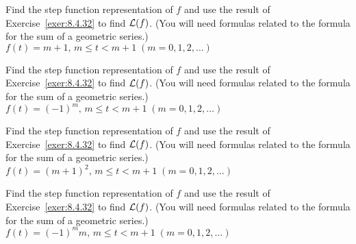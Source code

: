 \documentclass{ximera}
\begin{document}
\begin{problem}\label{exer:8.4.33}
 Find the step
function representation of $f$ and use the result of
Exercise~\ref{exer:8.4.32} to find ${\cal L}(f)$. (You will need
formulas related to the formula for the sum of a geometric series.)
$f(t)=m+1,\,m\le t<m+1\; (m=0,1,2,\dots)$
\end{problem}

\begin{problem}\label{exer:8.4.34}
 Find the step
function representation of $f$ and use the result of
Exercise~\ref{exer:8.4.32} to find ${\cal L}(f)$. (You will need
formulas related to the formula for the sum of a geometric series.)
$f(t)=(-1)^m,\,m\le t<m+1\; (m=0,1,2,\dots)$
\end{problem}

\begin{problem}\label{exer:8.4.35}
Find the step function representation of $f$ and use the result of Exercise~\ref{exer:8.4.32} to find ${\cal L}(f)$. (You will need
formulas related to the formula for the sum of a geometric series.)
$f(t)=(m+1)^2,\,m\le t<m+1\; (m=0,1,2,\dots)$
\end{problem}

\begin{problem}\label{exer:8.4.36}
 Find the step
function representation of $f$ and use the result of
Exercise~\ref{exer:8.4.32} to find ${\cal L}(f)$. (You will need
formulas related to the formula for the sum of a geometric series.)
$f(t)=(-1)^mm,\,m\le t<m+1\; (m=0,1,2,\dots)$
\end{problem}
\end{document}
